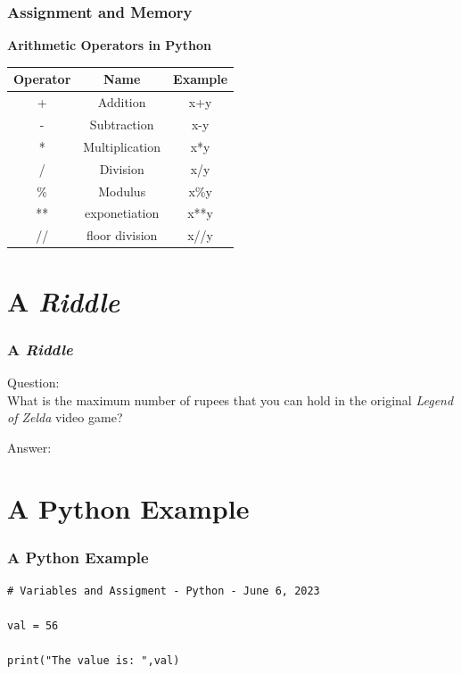 \documentclass[fleqn]{beamer} %
\newcommand{\sectiontitleIII}{Assignment and Memory}
\newcommand{\sectiontitleIV}{A {\it Riddle} }
\newcommand{\sectiontitleV}{A Python Example }
\begin{document}
	\begin{frame}[containsverbatim] \small
	\frametitle{\sectiontitleIII}

	\textbf{Arithmetic Operators in Python} \vspace{5mm} \\

	\renewcommand*{\arraystretch}{1.5}
	\begin{tabular}{|c|c|c|} \hline
		\textbf{Operator}& \textbf{Name}& \textbf{Example} \\ \hline
		+ & Addition& x+y \\ \hline
        - & Subtraction& x-y \\ \hline
        * & Multiplication& x*y \\ \hline
        / & Division& x/y \\ \hline
        \% & Modulus & x\%y \\ \hline
        ** & exponetiation & x**y \\ \hline
        // & floor division& x//y \\ \hline 
	\end{tabular}
	
	
	\end{frame}
	


\section{\sectiontitleIV}	
	\begin{frame}[label=sectionIV] \small
		\frametitle{\sectiontitleIV}    
		
		Question: \vspace{5mm}\\ What is the maximum number of rupees that you can hold in the original {\it Legend of Zelda} video game? 
		\vspace{25mm}
		
		Answer:

	\end{frame}

\section{\sectiontitleV}	
	\begin{frame}[label=sectionV,containsverbatim] \small
		\frametitle{\sectiontitleV}    
		
		\begin{lstlisting}
# Variables and Assigment - Python - June 6, 2023

val = 56 
	
print("The value is: ",val)
	
\end{lstlisting}

	\end{frame}
\end{document}
